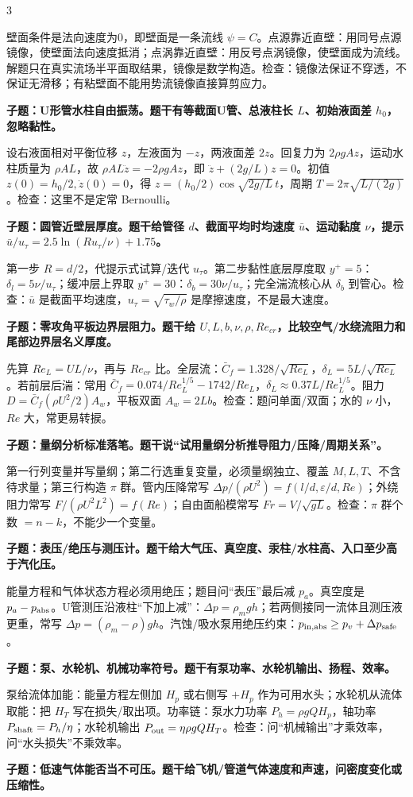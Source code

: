 \documentclass[a4paper]{article}
\newcommand{\qt}[1]{\vspace{0.10pt}\colorbox{Q}{\parbox{\dimexpr\linewidth-2\fboxsep}{\color{white}\bfseries #1}}\par}
\newcommand{\ans}[1]{\colorbox{G}{\parbox{\dimexpr\linewidth-2\fboxsep}{#1}}\par}
\begin{document}
\begin{multicols}{3}
\ans{壁面条件是法向速度为0，即壁面是一条流线 $\psi=C$。点源靠近直壁：用同号点源镜像，使壁面法向速度抵消；点涡靠近直壁：用反号点涡镜像，使壁面成为流线。解题只在真实流场半平面取结果，镜像是数学构造。检查：镜像法保证不穿透，不保证无滑移；有粘壁面不能用势流镜像直接算剪应力。}
\qt{子题：U形管水柱自由振荡。题干有等截面U管、总液柱长 $L$、初始液面差 $h_0$，忽略黏性。}
\ans{设右液面相对平衡位移 $z$，左液面为 $-z$，两液面差 $2z$。回复力为 $2\rho gAz$，运动水柱质量为 $\rho AL$，故 $\rho AL\ddot z=-2\rho gAz$，即 $\ddot z+(2g/L)z=0$。初值 $z(0)=h_0/2,\dot z(0)=0$，得 $z=(h_0/2)\cos\sqrt{2g/L}\,t$，周期 $T=2\pi\sqrt{L/(2g)}$。检查：这里不是定常 Bernoulli。}
\qt{子题：圆管近壁层厚度。题干给管径 $d$、截面平均时均速度 $\bar u$、运动黏度 $\nu$，提示 $\bar u/u_\tau=2.5\ln(Ru_\tau/\nu)+1.75$。}
\ans{第一步 $R=d/2$，代提示式试算/迭代 $u_\tau$。第二步黏性底层厚度取 $y^+=5$：$\delta_l=5\nu/u_\tau$；缓冲层上界取 $y^+=30$：$\delta_b=30\nu/u_\tau$；完全湍流核心从 $\delta_b$ 到管心。检查：$\bar u$ 是截面平均速度，$u_\tau=\sqrt{\tau_w/\rho}$ 是摩擦速度，不是最大速度。}
\qt{子题：零攻角平板边界层阻力。题干给 $U,L,b,\nu,\rho,Re_{cr}$，比较空气/水绕流阻力和尾部边界层名义厚度。}
\ans{先算 $Re_L=UL/\nu$，再与 $Re_{cr}$ 比。全层流：$\bar C_f=1.328/\sqrt{Re_L}$，$\delta_L=5L/\sqrt{Re_L}$。若前层后湍：常用 $\bar C_f=0.074/Re_L^{1/5}-1742/Re_L$，$\delta_L\approx0.37L/Re_L^{1/5}$。阻力 $D=\bar C_f(\rho U^2/2)A_w$，平板双面 $A_w=2Lb$。检查：题问单面/双面；水的 $\nu$ 小，$Re$ 大，常更易转捩。}
\qt{子题：量纲分析标准落笔。题干说“试用量纲分析推导阻力/压降/周期关系”。}
\ans{第一行列变量并写量纲；第二行选重复变量，必须量纲独立、覆盖 $M,L,T$、不含待求量；第三行构造 $\pi$ 群。管内压降常写 $\Delta p/(\rho U^2)=f(l/d,\varepsilon/d,Re)$；外绕阻力常写 $F/(\rho U^2L^2)=f(Re)$；自由面船模常写 $Fr=V/\sqrt{gL}$。检查：$\pi$ 群个数 $=n-k$，不能少一个变量。}
\qt{子题：表压/绝压与测压计。题干给大气压、真空度、汞柱/水柱高、入口至少高于汽化压。}
\ans{能量方程和气体状态方程必须用绝压；题目问“表压”最后减 $p_a$。真空度是 $p_a-p_{\rm abs}$。U管测压沿液柱“下加上减”：$\Delta p=\rho_mgh$；若两侧接同一流体且测压液更重，常写 $\Delta p=(\rho_m-\rho)gh$。汽蚀/吸水泵用绝压约束：$p_{\rm in,abs}\ge p_v+\Delta p_{\rm safe}$。}
\qt{子题：泵、水轮机、机械功率符号。题干有泵功率、水轮机输出、扬程、效率。}
\ans{泵给流体加能：能量方程左侧加 $H_p$ 或右侧写 $+H_p$ 作为可用水头；水轮机从流体取能：把 $H_T$ 写在损失/取出项。功率链：泵水力功率 $P_h=\rho gQH_p$，轴功率 $P_{\rm shaft}=P_h/\eta$；水轮机输出 $P_{\rm out}=\eta\rho gQH_T$。检查：问“机械输出”才乘效率，问“水头损失”不乘效率。}
\qt{子题：低速气体能否当不可压。题干给飞机/管道气体速度和声速，问密度变化或压缩性。}

\end{multicols}
\end{document}
